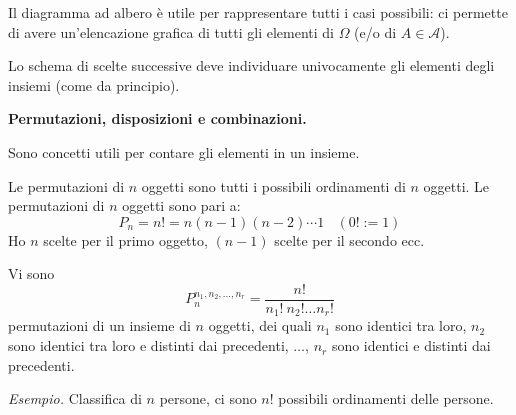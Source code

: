 
\begin{oss}
Il diagramma ad albero è utile per rappresentare tutti i casi possibili: ci permette di avere un'elencazione grafica di tutti gli elementi di $\Omega $ (e/o di $A\in \mathcal{A}$).
\end{oss}
\begin{oss}
Lo schema di scelte successive deve individuare univocamente gli elementi degli insiemi (come da principio).
\end{oss}


\textbf{Permutazioni, disposizioni e combinazioni.}

Sono concetti utili per contare gli elementi in un insieme.

\begin{definition}
Le permutazioni di $n$ oggetti sono tutti i possibili ordinamenti di $n$ oggetti. Le permutazioni di $n$ oggetti sono pari a:
\begin{equation*}
\boxed{P_{n} =n!=n( n-1)( n-2) \cdots 1} \ \ \ \ ( 0!:=1)
\end{equation*}
Ho $n$ scelte per il primo oggetto, $( n-1)$ scelte per il secondo ecc.
\end{definition}
\begin{oss}
Vi sono
\begin{equation*}
\boxed{P_{n}^{n_{1} ,n_{2} ,\dotsc ,n_{r}} =\frac{n!}{n_{1} !\ n_{2} !\dotsc n_{r} !}}
\end{equation*}
permutazioni di un insieme di $n$ oggetti, dei quali $n_{1}$ sono identici tra loro, $n_{2}$ sono identici tra loro e distinti dai precedenti, $\dotsc $, $n_{r}$ sono identici e distinti dai precedenti.
\end{oss}
\textit{Esempio.} Classifica di $n$ persone, ci sono $n!$ possibili ordinamenti delle persone.

